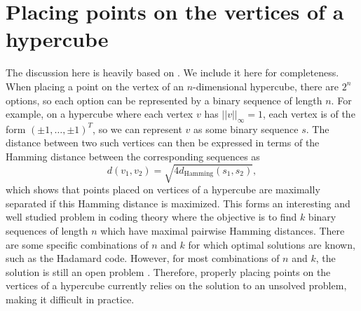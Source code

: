 \section{Placing points on the vertices of a hypercube}\label{sec:maximal_hamming_dists}
The discussion here is heavily based on \citep{sala2018representation}. We include it here for completeness. When placing a point on the vertex of an $n$-dimensional hypercube, there are $2^n$ options, so each option can be represented by a binary sequence of length $n$. For example, on a hypercube where each vertex $v$ has $||v||_\infty = 1$, each vertex is of the form $(\pm 1, \ldots, \pm 1)^T$, so we can represent $v$ as some binary sequence $s$. The distance between two such vertices can then be expressed in terms of the Hamming distance between the corresponding sequences as $$d(v_1, v_2) = \sqrt{4d_{\text{Hamming}} (s_1, s_2)},$$ which shows that points placed on vertices of a hypercube are maximally separated if this Hamming distance is maximized. This forms an interesting and well studied problem in coding theory where the objective is to find $k$ binary sequences of length $n$ which have maximal pairwise Hamming distances. There are some specific combinations of $n$ and $k$ for which optimal solutions are known, such as the Hadamard code. However, for most combinations of $n$ and $k$, the solution is still an open problem \citep{macwilliams1977theory}. Therefore, properly placing points on the vertices of a hypercube currently relies on the solution to an unsolved problem, making it difficult in practice.


